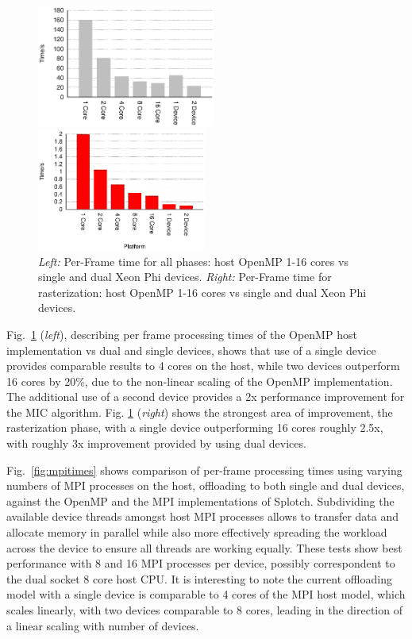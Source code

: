 \documentclass[runningheads,a4paper]{llncs}
\begin{document}
\begin{figure}
\centering
\begin{minipage}[t]{.45\textwidth}
  \centering
  \includegraphics[height=4.0cm]{TotalTime}
\end{minipage}
\begin{minipage}[t]{.45\textwidth}
  \centering
  \includegraphics[height=4.0cm]{Rotocol}
\end{minipage}
\caption{\emph{Left:} Per-Frame time for all phases: host OpenMP 1-16 cores vs single and dual Xeon Phi devices.
\emph{Right:} Per-Frame time for rasterization: host OpenMP 1-16 cores vs single and dual Xeon Phi devices.}
\label{fig:timings}
\end{figure}

Fig.~\ref{fig:timings} (\emph{left}), describing per frame processing times of the OpenMP host implementation vs dual and single devices, 
shows that use of a single device provides comparable results to 4 cores on the host, while two devices outperform 16 cores by 20\%, due to the 
non-linear scaling of the OpenMP implementation. The additional use of a second device provides a 2x performance improvement for the 
MIC algorithm. Fig. \ref{fig:timings} (\emph{right}) shows the strongest area of improvement, the rasterization phase, with a single 
device outperforming 16 cores roughly 2.5x, with roughly 3x improvement provided by using dual devices. 

Fig.~\ref{fig:mpitimes} shows comparison of per-frame processing times using varying numbers of MPI processes on the host, offloading to 
both single and dual devices, against the OpenMP and the MPI implementations of Splotch. Subdividing the available device threads 
amongst host MPI processes allows to transfer data and allocate memory in parallel while also more effectively spreading the 
workload across the device to ensure all threads are working equally. These tests show best performance with 8 and 16 MPI 
processes per device, possibly correspondent to the dual socket 8 core host CPU. It is interesting to note the current offloading model 
with a single device is comparable to 4 cores of the MPI host model, which scales linearly, with two devices comparable to 8 cores, leading 
in the direction of a linear scaling with number of devices.
\end{document}
